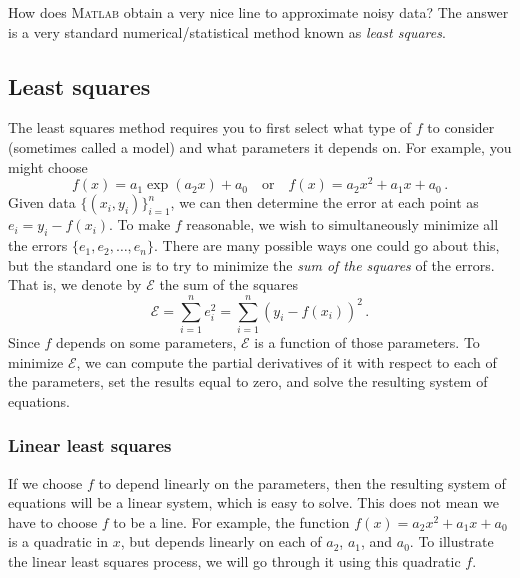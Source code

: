 How does \textsc{Matlab} obtain a very nice line to approximate noisy
data?  The answer is a very standard numerical/statistical method
known as {\em least squares}.


\subsection*{Least squares}

The least squares method requires you to first select what type of
\(f\) to consider (sometimes called a model) and what parameters it
depends on. For example, you might choose
\[
f(x) = a_1 \exp({a_2 x})+a_0 \quad\text{or}\quad f(x) = a_2 x^2 + a_1 x +a_0\,.  
\]
Given data \(\{(x_i,y_i)\}_{i=1}^n\), we can then determine the error
at each point as \(e_i = y_i - f(x_i)\). 
To make $f$ reasonable,
we wish to simultaneously minimize all the errors $\{e_1,e_2, \ldots, e_n\}$.
There are many possible ways one could go about this, but the standard one
is to try to minimize the {\em sum of the squares} of the errors. That is,
we denote by $\mathcal{E}$ the sum of the squares
\[
\mathcal{E} = \sum_{i=1}^n e_i^2
    = \sum_{i=1}^n \left( y_i - f(x_i) \right)^2
\,.
\]
Since \(f\) depends on some parameters, $\mathcal{E}$ is a function of
those parameters.
To minimize $\mathcal{E}$, we can compute the partial derivatives of
it with respect to each of the parameters, set the results
equal to zero, and solve the resulting system of equations.

\subsubsection*{Linear least squares}

If we choose \(f\) to depend linearly on the parameters, then the
resulting system of equations will be a linear system, which is easy
to solve. This does not mean we have to choose \(f\) to be a line.
For example, the function \(f(x) = a_2 x^2 + a_1 x +a_0\) is a
quadratic in \(x\), but
depends linearly on each of \(a_2\), \(a_1\), and \(a_0\).
To illustrate the linear least squares process, we will go through it
using this quadratic \(f\).

